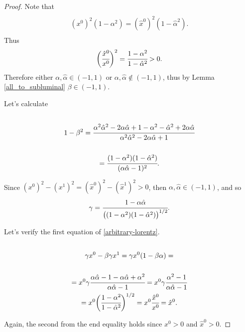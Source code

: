 \documentclass[main.tex]{subfiles}
\begin{document}
\begin{proof}
Note that
\begin{multline*}\\
(x^0)^2 (1 - \alpha^2) = (\hat{x}^0)^2 (1 - \hat{\alpha}^2).\\
\end{multline*}
Thus
\begin{equation}
\label{lorentz-proportions}
\bigg(\cfrac{\hat{x}^0}{x^0}\bigg)^2 = \cfrac{1 - \alpha^2}{1 - \hat{\alpha}^2} > 0.
\end{equation}
Therefore either $\alpha, \hat{\alpha} \in (-1, 1)$ or $\alpha, \hat{\alpha} \not\in (-1, 1)$, thus by Lemma \ref{all_to_subluminal} $\beta\in (-1, 1)$. 

Let's calculate
\begin{multline}
\label{one-minus-beta}\\
1 - \beta^2 = \cfrac{\alpha^2\hat{\alpha}^2 - 2\alpha\hat{\alpha} + 1 - \alpha^2 - \hat{\alpha}^2 +  2\alpha\hat{\alpha}}{\alpha^2\hat{\alpha}^2 - 2\alpha\hat{\alpha} + 1}\\
\\ = \cfrac{(1 - \alpha^2)(1 - \hat{\alpha}^2)}{(\alpha\hat{\alpha} - 1)^2}.
\\
\end{multline}

Since $(x^0)^2 - (x^1)^2  = (\hat{x}^0)^2 - (\hat{x}^1)^2 > 0$, then $\alpha, \hat{\alpha} \in (-1, 1)$, and so
\begin{equation}
\gamma = \cfrac{1 - \alpha\hat{\alpha}}{\big((1 - \alpha^2)(1 - \hat{\alpha}^2)\big)^{1/2}}.
\end{equation}

Let's verify the first equation of \ref{arbitrary-lorentz}.
\begin{multline}\\
\label{time-forced}
\gamma x^0 - \beta \gamma x^1 = \gamma x^0 (1 - \beta\alpha) = \\
\\ = x^0 \gamma \cfrac{\alpha\hat{\alpha} - 1 - \alpha\hat{\alpha} + \alpha^2}{\alpha\hat{\alpha} - 1}
=  x^0 \gamma \cfrac{\alpha^2 - 1}{\alpha\hat{\alpha} - 1}
\\ = x^0 \bigg(\cfrac{1 - \alpha^2}{1 - \hat{\alpha}^2}\bigg)^{1/2} = x^0 \cfrac{\hat{x}^0}{x^0}= \hat{x}^0. 
\\
\end{multline}

Again, the second from the end equality holds since $x^0 > 0$ and $\hat{x}^0 > 0$.


\end{proof}
\end{document}
